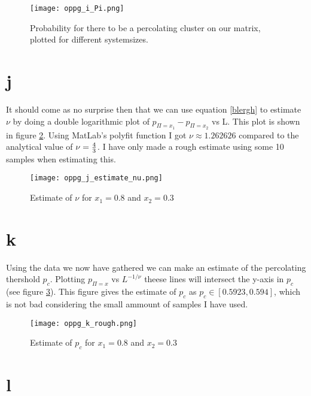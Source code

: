 \documentclass[a4paper,english, 10pt, twoside]{article}
\begin{document}
\begin{figure}[H]
 \centering
 \texttt{[image: oppg\_i\_Pi.png]}
 \caption{Probability for there to be a percolating cluster on our matrix, plotted for different systemsizes.}
 \label{Pi}
\end{figure}

\section*{j}

It should come as no surprise then that we can use equation \ref{blergh} to estimate $\nu$ by doing a double 
logarithmic plot of $p_{\Pi = x_1} - p_{\Pi = x_2}$ vs L. This plot is shown in figure \ref{estimate_nu}. 
Using MatLab's polyfit function I got $\nu \approx 1.262626$ compared to the analytical value of $\nu={4\over3}$. 
I have only made a rough estimate using some 10 samples when estimating this. 

\begin{figure}[H]
 \centering
 \texttt{[image: oppg\_j\_estimate\_nu.png]}
 \caption{Estimate of $\nu$ for $x_1 = 0.8$ and $x_2 = 0.3$}
 \label{estimate_nu}
\end{figure}

\section*{k}

Using the data we now have gathered we can make an estimate of the percolating thershold $p_c$. Plotting $p_{\Pi = x}$ 
vs $L^{-1/\nu}$ theese lines will intersect the y-axis in $p_c$ (see figure \ref{estimate_pc}). This figure gives the 
estimate of $p_c$ as $p_c \in [0.5923,0.594]$, which is not bad considering the small ammount of samples I have used.

\begin{figure}[H]
 \centering
 \texttt{[image: oppg\_k\_rough.png]}
 \caption{Estimate of $p_c$ for $x_1 = 0.8$ and $x_2 = 0.3$}
 \label{estimate_pc}
\end{figure}

\section*{l}
\end{document}
